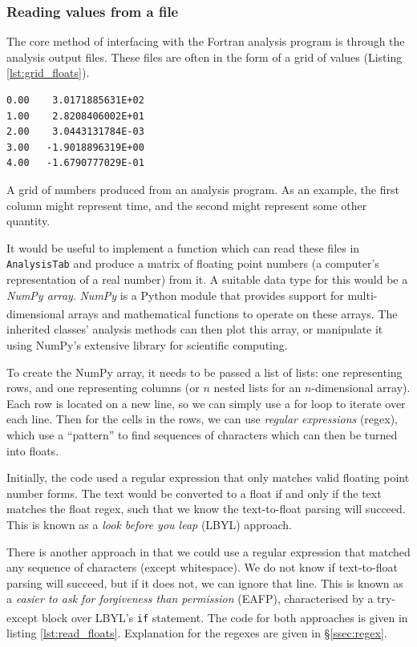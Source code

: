 \documentclass[12pt]{article}
\newenvironment{code}{\captionsetup{type=listing}}{\par\addvspace{\baselineskip}}
\begin{document}
\subsubsection{Reading values from a file}\label{sssec:read_floats}

The core method of interfacing with the Fortran analysis program is through the analysis output files. These files are often in the form of a grid of values (Listing \ref{lst:grid_floats}).

\begin{code}\begin{verbatim}
0.00    3.0171885631E+02
1.00    2.8208406002E+01
2.00    3.0443131784E-03
3.00   -1.9018896319E+00
4.00   -1.6790777029E-01
\end{verbatim}
\caption{A grid of numbers produced from an analysis program. As an example, the first column might represent time, and the second might represent some other quantity.}
\label{lst:grid_floats}
\end{code}

It would be useful to implement a function which can read these files in \texttt{AnalysisTab} and produce a matrix of floating point numbers (a computer's representation of a real number) from it. A suitable data type for this would be a \textit{NumPy array}. \textit{NumPy} is a Python module that provides support for multi-dimensional arrays and mathematical functions to operate on these arrays.\textsuperscript{\cite{numpy}} The inherited classes' analysis methods can then plot this array, or manipulate it using NumPy's extensive library for scientific computing.

To create the NumPy array, it needs to be passed a list of lists: one representing rows, and one representing columns (or \(n\) nested lists for an \(n\)-dimensional array). Each row is located on a new line, so we can simply use a for loop to iterate over each line. Then for the cells in the rows, we can use \textit{regular expressions} (regex), which use a ``pattern'' to find sequences of characters which can then be turned into floats.

Initially, the code used a regular expression that only matches valid floating point number forms. The text would be converted to a float if and only if the text matches the float regex, such that we know the text-to-float parsing will succeed. This is known as a \textit{look before you leap} (LBYL) approach.

There is another approach in that we could use a regular expression that matched any sequence of characters (except whitespace). We do not know if text-to-float parsing will succeed, but if it does not, we can ignore that line. This is known as a \textit{easier to ask for forgiveness than permission} (EAFP), characterised by a try-except block over LBYL's \texttt{if} statement.\textsuperscript{\cite{eafp}} The code for both approaches is given in listing \ref{lst:read_floats}. Explanation for the regexes are given in \S\ref{ssec:regex}.
\end{document}
